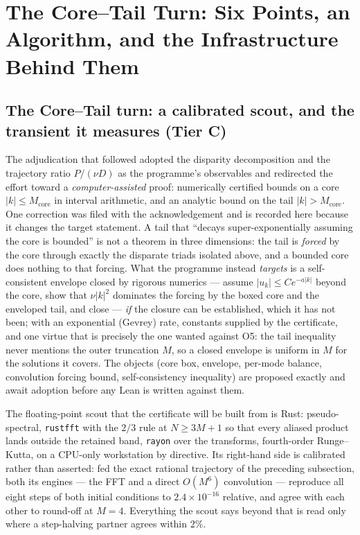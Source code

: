\documentclass[11pt,a4paper]{article}
\newcommand{\tC}{\textcolor{TierC}{\textbf{Tier C}}}
\theoremstyle{definition}
\theoremstyle{plain}
\begin{document}
\section{The Core--Tail Turn: Six Points, an Algorithm, and the Infrastructure Behind Them}
\label{sec:coretailturn}

\subsection{The Core--Tail turn: a calibrated scout, and the transient it measures (\tC{})}
\label{sec:coretail}

The adjudication that followed adopted the disparity decomposition and the trajectory ratio
$P/(\nu D)$ as the programme's observables and redirected the effort toward a
\emph{computer-assisted} proof: numerically certified bounds on a core $|k|\le M_{\mathrm{core}}$
in interval arithmetic, and an analytic bound on the tail $|k|>M_{\mathrm{core}}$. One
correction was filed with the acknowledgement and is recorded here because it changes the
target statement. A tail that ``decays super-exponentially assuming the core is bounded'' is
not a theorem in three dimensions: the tail is \emph{forced} by the core through exactly the
disparate triads isolated above, and a bounded core does nothing to that forcing. What the
programme instead \emph{targets} is a self-consistent envelope closed by rigorous numerics
--- assume $|u_k|\le Ce^{-a|k|}$
beyond the core, show that $\nu|k|^2$ dominates the forcing by the boxed core and the enveloped
tail, and close --- \emph{if} the closure can be established, which it has not been; with an
exponential (Gevrey) rate, constants supplied by the certificate,
and one virtue that is precisely the one wanted against O5: the tail inequality never mentions
the outer truncation $M$, so a closed envelope is uniform in $M$ for the solutions it covers.
The objects (core box, envelope, per-mode balance, convolution forcing bound, self-consistency
inequality) are proposed exactly and await adoption before any Lean is written against them.

The floating-point scout that the certificate will be built from is Rust: pseudo-spectral,
\texttt{rustfft} with the $2/3$ rule at $N\ge 3M+1$ so that every aliased product lands outside
the retained band, \texttt{rayon} over the transforms, fourth-order Runge--Kutta, on a CPU-only
workstation by directive. Its right-hand side is calibrated rather than asserted: fed the exact
rational trajectory of the preceding subsection, both its engines --- the FFT and a direct
$O(M^6)$ convolution --- reproduce all eight steps of both initial conditions to $2.4\times
10^{-16}$ relative, and agree with each other to round-off at $M=4$. Everything the scout says
beyond that is read only where a step-halving partner agrees within $2\%$.
\end{document}

